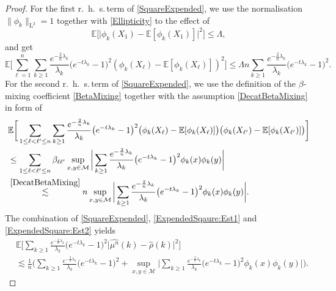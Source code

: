 \documentclass[11pt,a4paper,oneside]{amsart}
\numberwithin{equation}{section}
\newcommand{\LL}{\mathrm{L}}
\newcommand{\rhs}{r.~h.~s.\,}
\begin{document}
\begin{proof}
%
For the first \rhs term of \eqref{SquareExpended}, we use the normalisation $\|\phi_k\|_{\LL^2}=1$ together with \eqref{Ellipticity} to the effect of 
%
\begin{equation}\label{BoundsMomentVectors}
%
\mathbb{E}\big[\vert \phi_k(X_1)-\mathbb{E}[\phi_k(X_1)]\vert^2\big]\leq \Lambda,
%
\end{equation}
%
and get
%
\begin{equation}\label{ExpendedSqaure:Est1}
%
\mathbb{E}\bigg[\sum_{\ell=1}^n\sum_{k\geq 1} \frac{e^{-\frac{2}{n}\lambda_k}}{\lambda_k}\big(e^{-t\lambda_k}-1\big)^2(\phi_k(X_{\ell})-\mathbb{E}[\phi_k(X_\ell)])^2\bigg]\leq \Lambda n\sum_{k\geq 1} \frac{e^{-\frac{2}{n}\lambda_k}}{\lambda_k}\big(e^{-t\lambda_k}-1\big)^2.
%
\end{equation}
%
For the second \rhs term of \eqref{SquareExpended}, we use the definition of the $\beta$-mixing coefficient \eqref{BetaMixing} together with the assumption \eqref{DecatBetaMixing} in form of
%
\begin{equation}\label{ExpendedSquare:Est2}
%
\begin{aligned}
%
&\mathbb{E}\bigg[\sum_{1\leq \ell<\ell'\leq n}\sum_{k\geq 1} \frac{e^{-\frac{2}{n}\lambda_k}}{\lambda_k}\big(e^{-t\lambda_k}-1\big)^2\big(\phi_k(X_{\ell})-\mathbb{E}[\phi_k(X_\ell)]\big)\big(\phi_k(X_{\ell'})-\mathbb{E}[\phi_k(X_{\ell'})]\big)\bigg]\\
&\leq \sum_{1\leq \ell<\ell'\leq n}\beta_{\ell\ell'}\sup_{x,y\in\mathcal{M}}\bigg\vert\sum_{k\geq 1} \frac{e^{-\frac{2}{n}\lambda_k}}{\lambda_k}\big(e^{-t\lambda_k}-1\big)^2\phi_k(x)\phi_k(y)\bigg\vert\\
&\stackrel{\eqref{DecatBetaMixing}}{\lesssim}n\sup_{x,y\in\mathcal{M}}\bigg\vert\sum_{k\geq 1} \frac{e^{-\frac{2}{n}\lambda_k}}{\lambda_k}\big(e^{-t\lambda_k}-1\big)^2\phi_k(x)\phi_k(y)\bigg\vert.
%
\end{aligned}
%
\end{equation}
%
The combination of \eqref{SquareExpended}, \eqref{ExpendedSqaure:Est1} and \eqref{ExpendedSquare:Est2} yields
%
\begin{align*}
%
&\mathbb{E}\bigg[\sum_{k\geq 1} \frac{e^{-\frac{2}{n}\lambda_k}}{\lambda_k}\big(e^{-t\lambda_k}-1\big)^2\vert\widehat{\mu^n}(k)-\widehat{\rho}(k)\vert^2\bigg]\\
&\lesssim \frac{1}{n}\bigg(\sum_{k\geq 1} \frac{e^{-\frac{2}{n}\lambda_k}}{\lambda_k}\big(e^{-t\lambda_k}-1\big)^2+\sup_{x,y\in\mathcal{M}}\bigg\vert\sum_{k\geq 1} \frac{e^{-\frac{2}{n}\lambda_k}}{\lambda_k}\big(e^{-t\lambda_k}-1\big)^2\phi_k(x)\phi_k(y)\bigg\vert\bigg).

\end{align*}
\end{proof}
\end{document}
